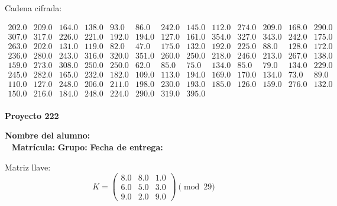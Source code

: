 \documentclass[12pt]{article}
\begin{document}
Cadena cifrada:
\begin{center}
$\begin{array}{lllllllllllll}
202.0 & 209.0 & 164.0 & 138.0 & 93.0 & 86.0 & 242.0 & 145.0 & 112.0 & 274.0 & 209.0 & 168.0 & 290.0\\
307.0 & 317.0 & 226.0 & 221.0 & 192.0 & 194.0 & 127.0 & 161.0 & 354.0 & 327.0 & 343.0 & 242.0 & 175.0\\
263.0 & 202.0 & 131.0 & 119.0 & 82.0 & 47.0 & 175.0 & 132.0 & 192.0 & 225.0 & 88.0 & 128.0 & 172.0\\
236.0 & 280.0 & 243.0 & 316.0 & 320.0 & 351.0 & 260.0 & 250.0 & 218.0 & 246.0 & 213.0 & 267.0 & 138.0\\
159.0 & 273.0 & 308.0 & 250.0 & 250.0 & 62.0 & 85.0 & 75.0 & 134.0 & 85.0 & 79.0 & 134.0 & 229.0\\
245.0 & 282.0 & 165.0 & 232.0 & 182.0 & 109.0 & 113.0 & 194.0 & 169.0 & 170.0 & 134.0 & 73.0 & 89.0\\
110.0 & 127.0 & 248.0 & 206.0 & 211.0 & 198.0 & 230.0 & 193.0 & 185.0 & 126.0 & 159.0 & 276.0 & 132.0\\
150.0 & 216.0 & 184.0 & 248.0 & 224.0 & 290.0 & 319.0 & 395.0\\
\end{array}$
\end{center}

\newpage


\textbf{Proyecto 222}

\textbf{Nombre del alumno:} \underline{\hspace{13cm}}\\\
\vspace{1cm}
\textbf{Matrícula:} \underline{\hspace{4cm}} \hspace{1cm}
\textbf{Grupo:} \underline{\hspace{2cm}}
\textbf{Fecha de entrega:} \underline{\hspace{2cm}}

\medskip

Matriz llave:
\[
K = \begin{pmatrix}
8.0 & 8.0 & 1.0\\
6.0 & 5.0 & 3.0\\
9.0 & 2.0 & 9.0
\end{pmatrix} \pmod{29}
\]
\end{document}

